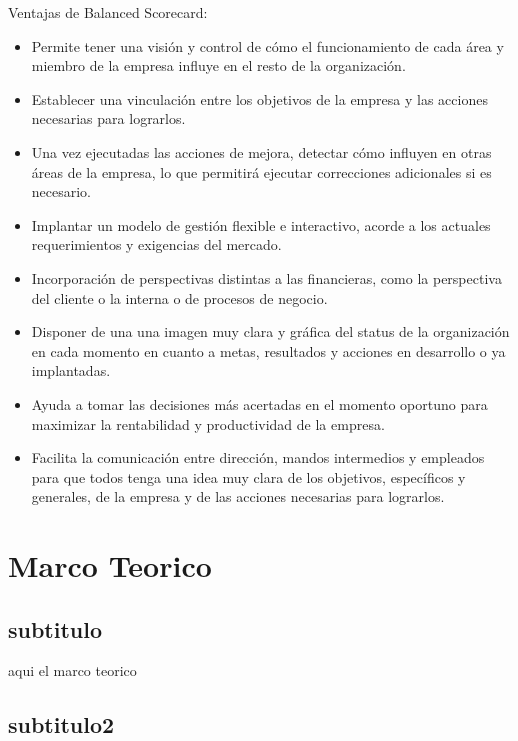 \documentclass[preprint,12pt]{elsarticle}
\begin{document}
Ventajas de Balanced Scorecard:
\begin{itemize}
		\item Permite tener una visión y control de cómo el funcionamiento de cada área y miembro de la empresa influye en el resto de la organización.
		\item Establecer una vinculación entre los objetivos de la empresa y las acciones necesarias para lograrlos.
		\item Una vez ejecutadas las acciones de mejora, detectar cómo influyen en otras áreas de la empresa, lo que permitirá ejecutar correcciones adicionales si es necesario.
		\item Implantar un modelo de gestión flexible e interactivo, acorde a los actuales requerimientos y exigencias del mercado.
		\item Incorporación de perspectivas distintas a las financieras, como la perspectiva del cliente o la interna o de procesos de negocio.
		\item Disponer de una una imagen muy clara y gráfica del status de la organización en cada momento en cuanto a metas, resultados y acciones en desarrollo o ya implantadas.
		\item Ayuda a tomar las decisiones más acertadas en el momento oportuno para maximizar la rentabilidad y productividad de la empresa.
		\item Facilita la comunicación entre dirección, mandos intermedios y empleados para que todos tenga una idea muy clara de los objetivos, específicos y generales, de la empresa y de las acciones necesarias para lograrlos.
	\end{itemize}


	
	

\section{Marco Teorico}
	
\subsection{subtitulo}	

	aqui el marco teorico 
		
\subsection{subtitulo2}
		
\end{document}
